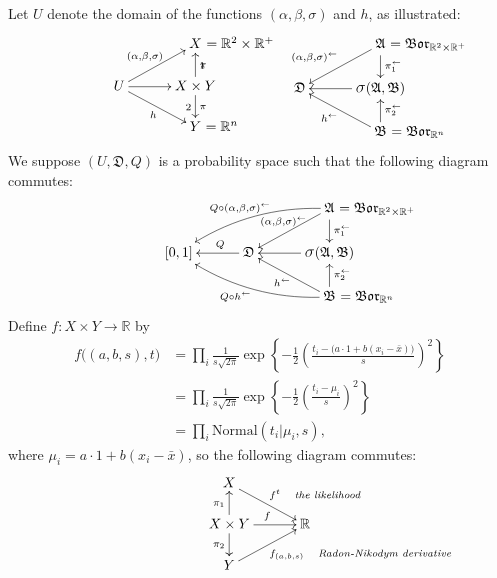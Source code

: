 \documentclass[
twoside=true,
paper=letter,
fontsize=9pt,
pagesize=auto,
leqno,
openany,
headsepline,
overfullrule,
]{scrbook}
\theoremstyle{plain}
\theoremstyle{plain}
\theoremstyle{definition}
\theoremstyle{bfnoteitalic}
\theoremstyle{bfnoteroman}
\newcommand{\sigalg}[1]{\mathfrak{#1}}
\newcommand{\borel}{\mathfrak{Bor}}
\newcommand{\sagb}{\mathop{\hbox{\large{$\sigma$}}}\nolimits}
\newcommand{\preimage}[1]{#1^{\leftarrow}}
\newcommand{\R}{\mathbb{R}}
\newcommand{\productsig}[2]{\sagb(#1,#2)}
\newcommand{\function}{f}
\newcommand{\measurespace}{X}
\newcommand{\measurespaceii}{Y}
\newcommand{\projectionone}{\pi_1}
\newcommand{\projectiontwo}{\pi_2}
\newcommand{\pspace}{\measurespace}%
\newcommand{\sspace}{\measurespaceii}%
\newcommand{\sspacesig}{\sigalg{B}}
\newcommand{\pspacesig}{\sigalg{A}}
\begin{document}
Let $U$ denote the domain of the functions $(\alpha, \beta,\sigma)$ and  $h$, as illustrated:
\[
\xymatrix@R=16pt@C=30pt{ 
 & \pspace \makebox[0pt][l]{ $=\R^2\times\R^+$}
 \\
 U \ar[ur]^{(\alpha, \beta,\sigma)}
 \ar[dr]_h
 \ar[r] &
 \pspace\times\sspace \ar[u]_\projectionone \ar[d]^\projectiontwo
 \\
  & \sspace\makebox[0pt][l]{ $= \R^n$}
  \\
}
%
\hspace{50pt}
%
\xymatrix@R=16pt@C=30pt{ 
 & \pspacesig \makebox[0pt][l]{ $=\borel_{\R^2\times\R^+}$}
 \ar[dl]_{\makebox[0pt][r]{$\scriptstyle\preimage{(\alpha,\beta,\sigma)}$}}
 \ar[d]^{\preimage{\projectionone}}
 \\
 \sigalg{D}  & 
 \productsig{\pspacesig}{\sspacesig} 
 \ar[l]  
 \\
  & \sspacesig \makebox[0pt][l]{ $=\borel_{\R^n}$}
  \ar[u]_{\preimage{\projectiontwo}}
  \ar[ul]^{\makebox[0pt][r]{$\scriptstyle\preimage{h}$}}
  \\
}
\]
We suppose $(U,\sigalg{D},Q)$ is a probability space such that the following diagram commutes:
\[
\xymatrix@R=16pt@C=30pt{ 
 & & \pspacesig \rlap{ $=\borel_{\R^2\times\R^+}$}
 \ar[dl]_{\kern30pt\preimage{(\alpha,\beta,\sigma)}} 
 \ar[d]^{\preimage{\projectionone}}
 \ar@/_10pt/[lld]_{Q\circ \preimage{(\alpha,\beta,\sigma)}}
 \\
 [0,1] & \sigalg{D} \ar[l]_-{\ Q} & 
 \productsig{\pspacesig}{\sspacesig} 
 \ar[l]  
 \\
 & & \sspacesig \rlap{ $=\borel_{\R^n}$}
  \ar[u]_{\preimage{\projectiontwo}}
  \ar[ul]^{\preimage{h}}
  \ar@/^10pt/[llu]^{Q\circ\preimage{h}\quad}
  \\
}
\]
Define $\function:\pspace \times \sspace \to\R$ by
\begin{align*}
\function\bigl((a,b,s),t\bigr)
& =
\prod_i
\frac{1}{s\sqrt{2\pi}}
\exp
\left\{
-\frac{1}{2}
\left(
\frac{t_i-\bigl( a\cdot 1 + b(x_i-\bar x) \bigr)}{s}
\right)^2
\right\} \\
& = 
\prod_i
\frac{1}{s\sqrt{2\pi}}
\exp
\left\{
-\frac{1}{2}
\left(
\frac{t_i-\mu_i}{s}
\right)^2
\right\} \\
& =
\prod_i
\text{Normal}(t_i\vert \mu_i, s),
\end{align*}
where $\mu_i=a\cdot 1 + b(x_i-\bar x)$,
so the following diagram commutes:
\[
\xymatrix@R=16pt@C=30pt{ 
\pspace
\ar[dr]^{\makebox[0pt][l]{$\scriptstyle{\function^t \quad \emph{\scriptsize the likelihood}}$}}
& \\
\pspace\times\sspace 
\ar[u]^{\projectionone}
\ar[d]_{\projectiontwo}
\ar[r]^{\function}
& \R \\
\sspace 
\ar[ur]_{\makebox[0pt][l]{$\scriptstyle{\function_{(a,b,s)} \quad \emph{\scriptsize Radon-Nikodym derivative}}$}}
& 
}
\]
\end{document}
